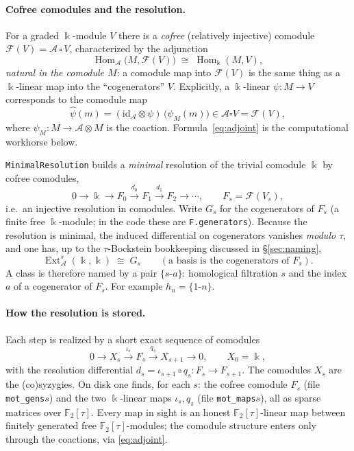 \documentclass[11pt]{article}
\newcommand{\Ext}{\operatorname{Ext}}
\newcommand{\Hom}{\operatorname{Hom}}
\newcommand{\id}{\mathrm{id}}
\newcommand{\A}{\mathcal{A}}
\newcommand{\F}{\mathbb{F}}
\newcommand{\kk}{\Bbbk}
\newcommand{\tcofree}[1]{\mathcal{F}(#1)}
\theoremstyle{definition}
\begin{document}
\paragraph{Cofree comodules and the resolution.}
For a graded $\kk$-module $V$ there is a \emph{cofree} (relatively injective)
comodule $\tcofree{V}=\A\,\square\,V$, characterized by the adjunction
\begin{equation}\label{eq:adjunction}
  \Hom_{\A}\bigl(M,\tcofree{V}\bigr)\;\cong\;\Hom_{\kk}(M,V),
\end{equation}
\emph{natural in the comodule $M$}: a comodule map into $\tcofree V$ is the same
thing as a $\kk$-linear map into the ``cogenerators'' $V$. Explicitly, a
$\kk$-linear $\psi\colon M\to V$ corresponds to the comodule map
\begin{equation}\label{eq:adjoint}
  \widehat\psi(m)=(\id_\A\otimes\psi)\,\bigl(\psi_M(m)\bigr)\in \A\square V=\tcofree V,
\end{equation}
where $\psi_M\colon M\to \A\otimes M$ is the coaction. Formula~\eqref{eq:adjoint} is
the computational workhorse below.

\texttt{MinimalResolution} builds a \emph{minimal} resolution of the trivial
comodule $\kk$ by cofree comodules,
\begin{equation}\label{eq:resolution}
  0\to \kk \xrightarrow{\ } F_0 \xrightarrow{d_0} F_1 \xrightarrow{d_1} F_2 \to\cdots,
  \qquad F_s=\tcofree{V_s},
\end{equation}
i.e.\ an injective resolution in comodules. Write $G_s$ for the cogenerators of
$F_s$ (a finite free $\kk$-module; in the code these are
\texttt{F.generators}). Because the resolution is minimal, the induced differential
on cogenerators vanishes \emph{modulo $\tau$}, and one has, up to the
$\tau$-Bockstein bookkeeping discussed in \S\ref{sec:naming},
\[
  \Ext_{\A}^{s}(\kk,\kk)\;\cong\;G_s
  \qquad(\text{a basis is the cogenerators of }F_s).
\]
A class is therefore named by a pair $\{s\text{-}a\}$: homological filtration $s$
and the index $a$ of a cogenerator of $F_s$. For example $h_n=\{1\text{-}n\}$.

\paragraph{How the resolution is stored.}
Each step is realized by a short exact sequence of comodules
\begin{equation}\label{eq:ses}
  0\to X_s \xrightarrow{\ \iota_s\ } F_s \xrightarrow{\ q_s\ } X_{s+1}\to 0,
  \qquad X_0=\kk,
\end{equation}
with the resolution differential $d_s=\iota_{s+1}\circ q_s\colon F_s\to F_{s+1}$.
The comodules $X_s$ are the (co)syzygies. On disk one finds, for each $s$: the
cofree comodule $F_s$ (file \texttt{mot\_gens}$s$) and the two $\kk$-linear maps
$\iota_s,q_s$ (file \texttt{mot\_maps}$s$), all as sparse matrices over $\F_2[\tau]$.
Every map in sight is an honest $\F_2[\tau]$-linear map between finitely generated
free $\F_2[\tau]$-modules; the comodule structure enters only through the
coactions, via \eqref{eq:adjoint}.
\end{document}
